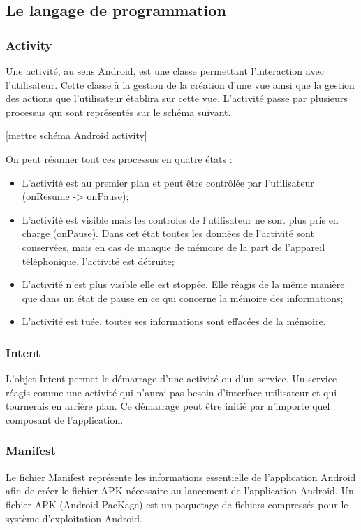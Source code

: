 \subsection{Le langage de programmation}

\subsubsection{Activity}

Une activité, au sens Android, est une classe permettant l’interaction avec l'utilisateur. Cette classe à la gestion de la création d'une vue ainsi que la gestion des actions que l'utilisateur établira sur cette vue. L'activité passe par plusieurs processus qui sont représentés sur le schéma suivant.

[mettre schéma Android activity]

On peut résumer tout ces processus en quatre états :
\begin{itemize}
	\item L'activité est au premier plan et peut être contrôlée par l'utilisateur (onResume -> onPause);
	\item L'activité est visible mais les controles de l'utilisateur ne sont plus pris en charge (onPause). Dans cet état toutes les données de l'activité sont conservées, mais en cas de manque de mémoire de la part de l'appareil téléphonique, l'activité est détruite;
	\item L'activité n'est plus visible elle est stoppée. Elle réagis de la même manière que dans un état de pause en ce qui concerne la mémoire des informations;
	\item L'activité est tuée, toutes ses informations sont effacées de la mémoire.
\end{itemize}

\subsubsection{Intent}

L'objet Intent permet le démarrage d'une activité ou d'un service. Un service réagis comme une activité qui n'aurai pas besoin d'interface utilisateur et qui tournerais en arrière plan. Ce démarrage peut être initié par n'importe quel composant de l'application.

\subsubsection{Manifest}
Le fichier Manifest représente les informations essentielle de l'application Android afin de créer le fichier APK nécessaire au lancement de l'application Android. Un fichier APK (Android PacKage) est un paquetage de fichiers compressés pour le système d'exploitation Android.

